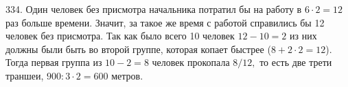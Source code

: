 334. Один человек без присмотра начальника потратил бы на работу в $6\cdot2=12$ раз больше времени. Значит, за такое же время с работой справились бы 12 человек без присмотра. Так как было всего 10 человек $12-10=2$ из них должны были быть во второй группе, которая копает быстрее ($8+2\cdot2=12$). Тогда первая группа из $10-2=8$ человек прокопала $8/12,$ то есть две трети траншеи, $900:3\cdot2=600$ метров.\\
